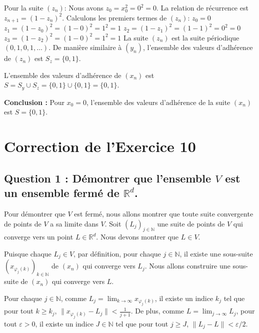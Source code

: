 \documentclass{report}
\begin{document}
Pour la suite $(z_n)$:
Nous avons $z_0 = x_0^2 = 0^2 = 0$.
La relation de récurrence est $z_{n+1} = (1 - z_n)^2$.
Calculons les premiers termes de $(z_n)$:
$z_0 = 0$
$z_1 = (1 - z_0)^2 = (1 - 0)^2 = 1^2 = 1$
$z_2 = (1 - z_1)^2 = (1 - 1)^2 = 0^2 = 0$
$z_3 = (1 - z_2)^2 = (1 - 0)^2 = 1^2 = 1$
La suite $(z_n)$ est la suite périodique $(0, 1, 0, 1, \dots)$.
De manière similaire à $(y_n)$, l'ensemble des valeurs d'adhérence de $(z_n)$ est $S_z = \{0, 1\}$.

L'ensemble des valeurs d'adhérence de $(x_n)$ est $S = S_y \cup S_z = \{0, 1\} \cup \{0, 1\} = \{0, 1\}$.

\textbf{Conclusion :} Pour $x_0 = 0$, l'ensemble des valeurs d'adhérence de la suite $(x_n)$ est $S = \{0, 1\}$.

\newpage


\chapter*{Correction de l'Exercice 10}

\section*{Question 1 : Démontrer que l'ensemble $V$ est un ensemble fermé de $\mathbb{R}^d$.}

Pour démontrer que $V$ est fermé, nous allons montrer que toute suite convergente de points de $V$ a sa limite dans $V$.
Soit $(L_j)_{j \in \mathbb{N}}$ une suite de points de $V$ qui converge vers un point $L \in \mathbb{R}^d$. Nous devons montrer que $L \in V$.

Puisque chaque $L_j \in V$, par définition, pour chaque $j \in \mathbb{N}$, il existe une sous-suite $(x_{\varphi_j(k)})_{k \in \mathbb{N}}$ de $(x_n)$ qui converge vers $L_j$.
Nous allons construire une sous-suite de $(x_n)$ qui converge vers $L$.

Pour chaque $j \in \mathbb{N}$, comme $L_j = \lim_{k \to \infty} x_{\varphi_j(k)}$, il existe un indice $k_j$ tel que pour tout $k \ge k_j$, $\|x_{\varphi_j(k)} - L_j\| < \frac{1}{j+1}$.
De plus, comme $L = \lim_{j \to \infty} L_j$, pour tout $\varepsilon > 0$, il existe un indice $J \in \mathbb{N}$ tel que pour tout $j \ge J$, $\|L_j - L\| < \varepsilon/2$.
\end{document}
